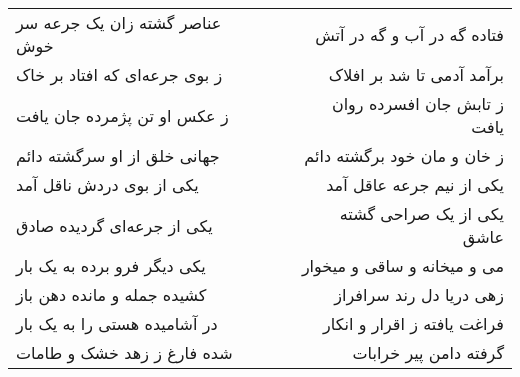 \begin{center}
\begin{longtable}{l p{0.5cm} r}
عناصر گشته زان یک جرعه سر خوش
&&
فتاده گه در آب و گه در آتش
\\
ز بوی جرعه‌ای که افتاد بر خاک
&&
برآمد آدمی تا شد بر افلاک
\\
ز عکس او تن پژمرده جان یافت
&&
ز تابش جان افسرده روان یافت
\\
جهانی خلق از او سرگشته دائم
&&
ز خان و مان خود برگشته دائم
\\
یکی از بوی دردش ناقل آمد
&&
یکی از نیم جرعه عاقل آمد
\\
یکی از جرعه‌ای گردیده صادق
&&
یکی از یک صراحی گشته عاشق
\\
یکی دیگر فرو برده به یک بار
&&
می و میخانه و ساقی و میخوار
\\
کشیده جمله و مانده دهن باز
&&
زهی دریا دل رند سرافراز
\\
در آشامیده هستی را به یک بار
&&
فراغت یافته ز اقرار و انکار
\\
شده فارغ ز زهد خشک و طامات
&&
گرفته دامن پیر خرابات
\\
\end{longtable}
\end{center}
